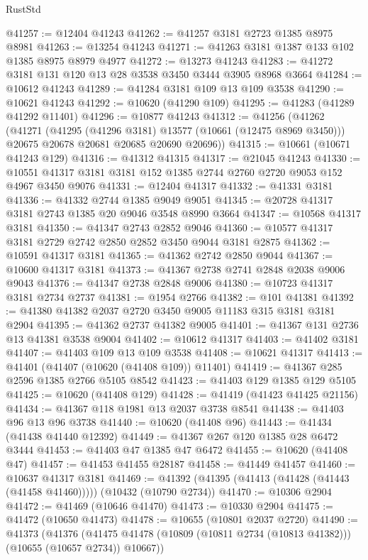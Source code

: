 \begin{lexlean}{RustStd}
\begin{coremodule}
@41257 := @12404 @41243
@41262 := @41257 @3181 @2723 @1385 @8975 @8981
@41263 := @13254 @41243
@41271 := @41263 @3181 @1387 @133 @102 @1385 @8975 @8979 @4977
@41272 := @13273 @41243
@41283 := @41272 @3181 @131 @120 @13 @28 @3538 @3450 @3444 @3905 @8968 @3664
@41284 := @10612 @41243
@41289 := @41284 @3181 @109 @13 @109 @3538
@41290 := @10621 @41243
@41292 := @10620 (@41290 @109)
@41295 := @41283 (@41289 @41292 @11401)
@41296 := @10877 @41243
@41312 := @41256
    (@41262
      (@41271
        (@41295 (@41296 @3181) @13577 (@10661 (@12475 @8969 @3450)))
        @20675
        @20678
        @20681
        @20685
        @20690
        @20696))
@41315 := @10661 (@10671 @41243 @129)
@41316 := @41312 @41315
@41317 := @21045 @41243
@41330 := @10551 @41317 @3181 @3181 @152 @1385 @2744 @2760 @2720 @9053 @152 @4967 @3450 @9076
@41331 := @12404 @41317
@41332 := @41331 @3181
@41336 := @41332 @2744 @1385 @9049 @9051
@41345 := @20728 @41317 @3181 @2743 @1385 @20 @9046 @3548 @8990 @3664
@41347 := @10568 @41317 @3181
@41350 := @41347 @2743 @2852 @9046
@41360 := @10577 @41317 @3181 @2729 @2742 @2850 @2852 @3450 @9044 @3181 @2875
@41362 := @10591 @41317 @3181
@41365 := @41362 @2742 @2850 @9044
@41367 := @10600 @41317 @3181
@41373 := @41367 @2738 @2741 @2848 @2038 @9006 @9043
@41376 := @41347 @2738 @2848 @9006
@41380 := @10723 @41317 @3181 @2734 @2737
@41381 := @1954 @2766
@41382 := @101 @41381
@41392 := @41380 @41382 @2037 @2720 @3450 @9005 @11183 @315 @3181 @3181 @2904
@41395 := @41362 @2737 @41382 @9005
@41401 := @41367 @131 @2736 @13 @41381 @3538 @9004
@41402 := @10612 @41317
@41403 := @41402 @3181
@41407 := @41403 @109 @13 @109 @3538
@41408 := @10621 @41317
@41413 := @41401 (@41407 (@10620 (@41408 @109)) @11401)
@41419 := @41367 @285 @2596 @1385 @2766 @5105 @8542
@41423 := @41403 @129 @1385 @129 @5105
@41425 := @10620 (@41408 @129)
@41428 := @41419 (@41423 @41425 @21156)
@41434 := @41367 @118 @1981 @13 @2037 @3738 @8541
@41438 := @41403 @96 @13 @96 @3738
@41440 := @10620 (@41408 @96)
@41443 := @41434 (@41438 @41440 @12392)
@41449 := @41367 @267 @120 @1385 @28 @6472 @3444
@41453 := @41403 @47 @1385 @47 @6472
@41455 := @10620 (@41408 @47)
@41457 := @41453 @41455 @28187
@41458 := @41449 @41457
@41460 := @10637 @41317 @3181
@41469 := @41392 (@41395 (@41413 (@41428 (@41443 (@41458 @41460))))) (@10432 (@10790 @2734))
@41470 := @10306 @2904
@41472 := @41469 (@10646 @41470)
@41473 := @10330 @2904
@41475 := @41472 (@10650 @41473)
@41478 := @10655 (@10801 @2037 @2720)
@41490 := @41373
    (@41376 (@41475 @41478 (@10809 (@10811 @2734 (@10813 @41382))) (@10655 (@10657 @2734)) @10667))

\end{coremodule}
\end{lexlean}
